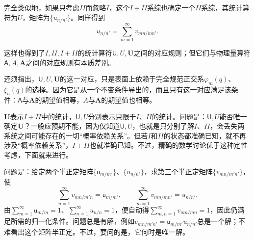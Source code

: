 \documentclass[fontsize=13pt,twoside,openany,headings=normal,parskip=false,bookmarkpackage=false,DIV=calc]{scrbook}
\begin{document}
完全类似地，如果只考虑$II$而忽略$I$，这个$I+II$系综也确定一个$II$系综，其统计算符为$U$，矩阵为$\{u_{n/n'}\}$。同样得到
\[
 u_{n/n'}=\sum_{m=1}^{\infty}v_{mn/mn'}.
\]

这样也得到了$I,\allowbreak II,\allowbreak I+II$的统计算符$\mathsf U,\allowbreak U,\allowbreak \boldsymbol U$之间的对应规则；但它们与物理量算符$\mathsf A,\allowbreak A,\allowbreak \boldsymbol A$之间的对应规则有本质差别。

\hypertarget{origpage-227}{}\label{origpage-227}还须指出，$\mathsf U,\allowbreak U,\allowbreak \boldsymbol U$的这一对应，只是表面上依赖于完全规范正交系$\varphi_m(q)$、$\xi_n(q)$的选择。因为它是从一个不变条件导出的，而且只有这一对应满足该条件：$\mathsf A$与$\boldsymbol A$的期望值相等，$A$与$\boldsymbol A$的期望值也相等。

$\boldsymbol U$表示$I+II$中的统计，$\mathsf U,\allowbreak U$分别表示只限于$I$、$II$的统计。问题是：$\mathsf U,\allowbreak U$能否唯一确定$\boldsymbol U$？一般应预期不能，因为仅知道$\mathsf U,\allowbreak U$，也就是只分别了解$I$、$II$，会丢失两系统之间可能存在的一切“概率依赖关系”。但若$I$和$II$的状态都准确已知，就不再涉及“概率依赖关系”，$I+II$也就准确已知。不过，精确的数学讨论优于这种定性考虑，下面就来进行。

问题是：给定两个半正定矩阵$\{\mathsf u_{m/m'}\}$、$\{u_{n/n'}\}$，求第三个半正定矩阵$\{v_{mn/m'n'}\}$，使
\[
 \sum_{n=1}^{\infty}v_{mn/m'n}=\mathsf u_{m/m'},\qquad
 \sum_{m=1}^{\infty}v_{mn/mn'}=u_{n/n'}.
\]
由$\sum_{m=1}^{\infty}\mathsf u_{m/m}=1$、$\sum_{n=1}^{\infty}u_{n/n}=1$，便自动得$\sum_{m,\allowbreak n=1}^{\infty}v_{mn/mn}=1$，因此仍满足所需的归一化条件。问题总是有解，例如$v_{mn/m'n'}=\mathsf u_{m/m'}u_{n/n'}$总是一个解；不难看出这个矩阵半正定。不过，要问的是，它何时是唯一解。
\end{document}
